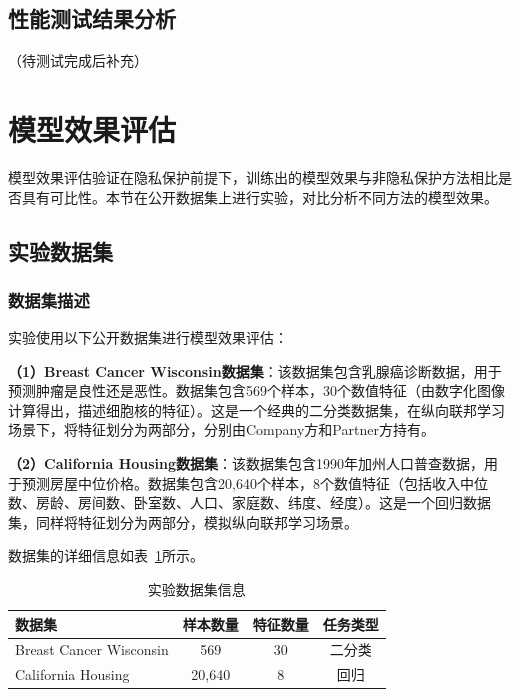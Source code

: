 \subsection{性能测试结果分析}

（待测试完成后补充）

\section{模型效果评估}
\label{sec:model-eval}

模型效果评估验证在隐私保护前提下，训练出的模型效果与非隐私保护方法相比是否具有可比性。本节在公开数据集上进行实验，对比分析不同方法的模型效果。

\subsection{实验数据集}

\subsubsection{数据集描述}

实验使用以下公开数据集进行模型效果评估：

\textbf{（1）Breast Cancer Wisconsin数据集}：该数据集包含乳腺癌诊断数据，用于预测肿瘤是良性还是恶性。数据集包含569个样本，30个数值特征（由数字化图像计算得出，描述细胞核的特征）。这是一个经典的二分类数据集，在纵向联邦学习场景下，将特征划分为两部分，分别由Company方和Partner方持有。

\textbf{（2）California Housing数据集}：该数据集包含1990年加州人口普查数据，用于预测房屋中位价格。数据集包含20,640个样本，8个数值特征（包括收入中位数、房龄、房间数、卧室数、人口、家庭数、纬度、经度）。这是一个回归数据集，同样将特征划分为两部分，模拟纵向联邦学习场景。

数据集的详细信息如表~\ref{tab:dataset-info}所示。

\begin{table}[htbp]
    \centering
    \caption{实验数据集信息}
    \label{tab:dataset-info}
    \begin{tabular}{lccc}
        \toprule
        \textbf{数据集} & \textbf{样本数量} & \textbf{特征数量} & \textbf{任务类型} \\
        \midrule
        Breast Cancer Wisconsin & 569 & 30 & 二分类 \\
        California Housing & 20,640 & 8 & 回归 \\
        \bottomrule
    \end{tabular}
\end{table}

